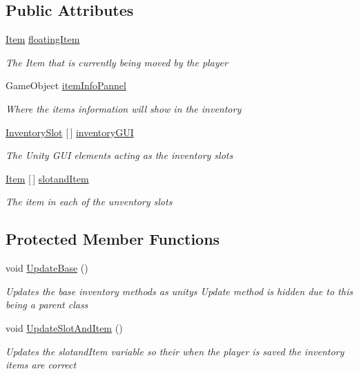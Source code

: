 \subsection*{Public Attributes}
\begin{DoxyCompactItemize}
\item 
\hyperlink{struct_bee_game_1_1_items_1_1_item}{Item} \hyperlink{class_bee_game_1_1_inventory_1_1_inventory_base_aa018ec0acd2aa39dd922f0a1bc1411e6}{floating\+Item}
\begin{DoxyCompactList}\small\item\em The Item that is currently being moved by the player \end{DoxyCompactList}\item 
Game\+Object \hyperlink{class_bee_game_1_1_inventory_1_1_inventory_base_af1def3187f007a5a3bb6fbe71854afdc}{item\+Info\+Pannel}
\begin{DoxyCompactList}\small\item\em Where the item\textquotesingle{}s information will show in the inventory \end{DoxyCompactList}\item 
\hyperlink{class_bee_game_1_1_inventory_1_1_inventory_slot}{Inventory\+Slot} \mbox{[}$\,$\mbox{]} \hyperlink{class_bee_game_1_1_inventory_1_1_inventory_base_a48dcba7ad7bfa1bed8c9ae290fb32857}{inventory\+G\+UI}
\begin{DoxyCompactList}\small\item\em The Unity G\+UI elements acting as the inventory slots \end{DoxyCompactList}\item 
\hyperlink{struct_bee_game_1_1_items_1_1_item}{Item} \mbox{[}$\,$\mbox{]} \hyperlink{class_bee_game_1_1_inventory_1_1_inventory_base_a405502a6eabf14e1498d96dc8aff5e8d}{slotand\+Item}
\begin{DoxyCompactList}\small\item\em The item in each of the unventory slots \end{DoxyCompactList}\end{DoxyCompactItemize}
\subsection*{Protected Member Functions}
\begin{DoxyCompactItemize}
\item 
void \hyperlink{class_bee_game_1_1_inventory_1_1_inventory_base_aa1a965cf7ba9e04b22a4ef85ad133854}{Update\+Base} ()
\begin{DoxyCompactList}\small\item\em Updates the base inventory methods as unitys Update method is hidden due to this being a parent class \end{DoxyCompactList}\item 
void \hyperlink{class_bee_game_1_1_inventory_1_1_inventory_base_aad83f463fba0efeffa7bdd2f92963ea9}{Update\+Slot\+And\+Item} ()
\begin{DoxyCompactList}\small\item\em Updates the slotand\+Item variable so their when the player is saved the inventory items are correct \end{DoxyCompactList}\end{DoxyCompactItemize}
